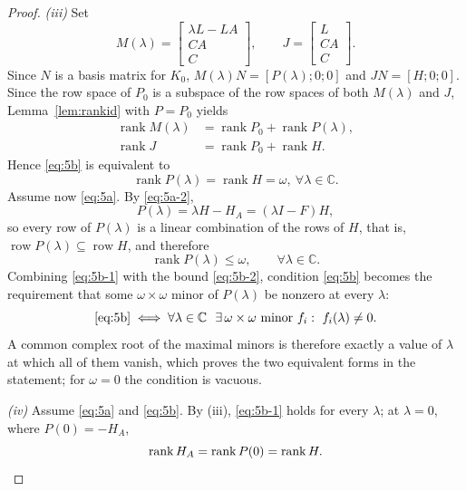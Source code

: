 \documentclass[journal]{IEEEtran}
\theoremstyle{plainn}
\theoremstyle{remark}
\begin{document}
\begin{proof}
\emph{(iii)} Set
\begin{equation*}
M(\lambda)=\begin{bmatrix}
	\lambda L-LA\\CA\\C
\end{bmatrix},\qquad J=\begin{bmatrix}
L \\ CA \\C
\end{bmatrix}.
\end{equation*}
Since $N$ is a basis matrix for $K_0$, $M(\lambda)N=[P(\lambda);0;0]$ and $JN=[H;0;0]$.
Since the row space of $P_0$ is a subspace of the row spaces of both $M(\lambda)$ and $J$,
Lemma~\ref{lem:rankid} with $P=P_0$ yields
\begin{equation*}
\begin{aligned}
\operatorname{rank}M(\lambda)&=\operatorname{rank}P_0+\operatorname{rank}P(\lambda),\\
\operatorname{rank}J&=\operatorname{rank}P_0+\operatorname{rank}H .
\end{aligned}
\end{equation*}
Hence \eqref{eq:5b} is equivalent to
\begin{equation}\label{eq:5b-1}
\operatorname{rank}P(\lambda)=\operatorname{rank}H=\omega,\ \forall \lambda\in\mathbb C.
\end{equation}
 Assume now \eqref{eq:5a}. By \eqref{eq:5a-2},
\begin{equation*}
P(\lambda)=\lambda H-H_A=(\lambda I-F)H ,
\end{equation*}
so every row of $P(\lambda)$ is a linear combination of the rows of $H$, that is, $\operatorname{row}P(\lambda)\subseteq\operatorname{row}H$, and therefore
\begin{equation}\label{eq:5b-2}
\operatorname{rank}P(\lambda)\le\omega,\qquad \forall\lambda\in\mathbb C .
\end{equation}
Combining \eqref{eq:5b-1} with the bound \eqref{eq:5b-2}, condition \eqref{eq:5b} becomes the requirement that some $\omega\times\omega$ minor of $P(\lambda)$ be nonzero at every $\lambda$:
\begin{equation*}
\eqref{eq:5b}
\iff
\forall\lambda\in\mathbb C\ \ \exists\,\omega\times\omega\text{ minor } f_i:\ f_i(\lambda)\neq0 .
\end{equation*}
A common complex root of the maximal minors is therefore exactly a value of $\lambda$ at which all of them vanish, which proves the two equivalent forms in the statement; for $\omega=0$ the condition is vacuous.

\emph{(iv)} Assume \eqref{eq:5a} and \eqref{eq:5b}. By (iii), \eqref{eq:5b-1} holds for every $\lambda$; at $\lambda=0$, where $P(0)=-H_A$,
\begin{equation*}
\operatorname{rank}H_A=\operatorname{rank}P(0)=\operatorname{rank}H . \qedhere
\end{equation*}
\end{proof}
\end{document}
